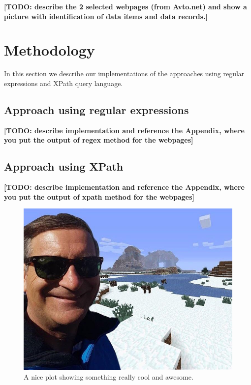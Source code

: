 \documentclass[9pt]{IEEEtran}
\begin{document}
\textbf{[TODO: describe the 2 selected webpages (from Avto.net) and show a picture with identification of data items and data records.]}

\section{Methodology}
\label{section:methodology}

In this section we describe our implementations of the approaches using regular expressions and XPath query language.

\subsection{Approach using regular expressions}
\label{section:regex}
\textbf{[TODO: describe implementation and reference the Appendix, where you put the output of regex method for the webpages]}

\subsection{Approach using XPath}
\label{section:xpath}
\textbf{[TODO: describe implementation and reference the Appendix, where you put the output of xpath method for the webpages]}

\begin{figure}[h]
    \centering
    \includegraphics[width=1\columnwidth]{plot1.jpg}
    \caption{A nice plot showing something really cool and awesome.}
    \label{fig:plot1}
\end{figure}
\end{document}
